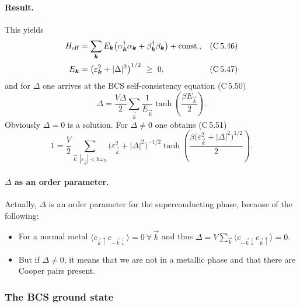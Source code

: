 \documentclass[../../main.tex]{subfiles}
\begin{document}
\paragraph{Result.}
This yields
\begin{align}
H_{\mathrm{eff}} &= \sum_{\vec k}E_{\vec k}
  \big(\alpha^\dagger_{\vec k}\alpha_{\vec k}
     + \beta^\dagger_{\vec k}\beta_{\vec k}\big) + \mathrm{const.},
  &&\text{(C\,5.46)}
\label{eq:h-eff}\\
E_{\vec k} &= \big(\varepsilon_{\vec k}^2+|\Delta|^2\big)^{1/2}\ \ge\ 0 ,
  &&\text{(C\,5.47)}
\label{eq:e-k}
\end{align}
and for $\Delta$ one arrives at the BCS self-consistency equation (C\,5.50)
\begin{equation}
\Delta = \frac{V\Delta}{2}\sum_{\vec k}\frac{1}{E_{\vec k}}
  \tanh\!\left(\frac{\beta E_{\vec k}}{2}\right).
\label{eq:gap-selfconsistency}
\end{equation}
Obviously $\Delta=0$ is a solution. For $\Delta\neq0$ one obtains (C\,5.51)
\begin{equation}
1 = \frac V2\sum_{\vec k, |\varepsilon_{\vec k}|<\hbar\omega_D}
  \big(\varepsilon_{\vec k}^2+|\Delta|^2\big)^{-1/2}
  \tanh\!\left(
    \frac{\beta\big(\varepsilon_{\vec k}^2+|\Delta|^2\big)^{1/2}}{2}\right).
\label{eq:gap-equation}
\end{equation}

\paragraph{$\Delta$ as an order parameter.}
Actually, $\Delta$ is an order parameter for the superconducting phase, because of the
following:
\begin{itemize}
\item For a normal metal
$\langle c_{\vec k\uparrow}c_{-\vec k\downarrow}\rangle=0\ \forall\,\vec k$ and thus
$\Delta = V\sum_{\vec k}\langle c_{-\vec k\downarrow}c_{\vec k\uparrow}\rangle = 0$.
\item But if $\Delta\neq0$, it means that we are not in a metallic phase and that there
are Cooper pairs present.
\end{itemize}

\subsubsection{The BCS ground state}
\label{subsubsec:bcs-ground-state_overview}
\end{document}

